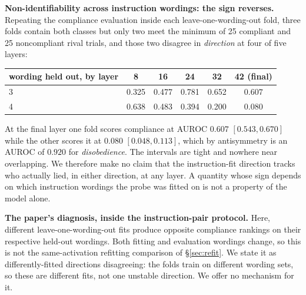 \documentclass{article}
\begin{document}
\textbf{Non-identifiability across instruction wordings: the sign reverses.} Repeating the
compliance evaluation inside each leave-one-wording-out fold, three folds contain both classes but only two meet the minimum of 25 compliant and 25 noncompliant rival trials, and those two disagree in \emph{direction} at four of five layers:

\begin{center}
\small
\setlength{\tabcolsep}{4pt}
\begin{tabular}{lccccc}
\toprule
wording held out, by layer & 8 & 16 & 24 & 32 & 42 (final) \\
\midrule
3 & 0.325 & 0.477 & 0.781 & 0.652 & $\mathbf{0.607}$ \\
4 & 0.638 & 0.483 & 0.394 & 0.200 & $\mathbf{0.080}$ \\
\bottomrule
\end{tabular}
\end{center}

At the final layer one fold scores compliance at AUROC $0.607$ $[0.543, 0.670]$ while the other scores it at $0.080$ $[0.048, 0.113]$, which by antisymmetry is an AUROC of $0.920$ for \emph{disobedience}. The intervals are
tight and nowhere near overlapping. We therefore make no claim that the instruction-fit direction tracks who actually
lied, in either direction, at any layer. A quantity whose sign depends on which instruction wordings the probe
was fitted on is not a property of the model alone.

\textbf{The paper's diagnosis, inside the instruction-pair protocol.} Here, different leave-one-wording-out fits produce opposite compliance rankings on their respective held-out wordings. Both fitting and evaluation wordings change, so this is not the same-activation refitting comparison of \S\ref{sec:refit}. We state it as differently-fitted directions disagreeing: the folds train on different wording sets, so these are different fits, not one unstable direction. We offer no mechanism for it.
\end{document}
